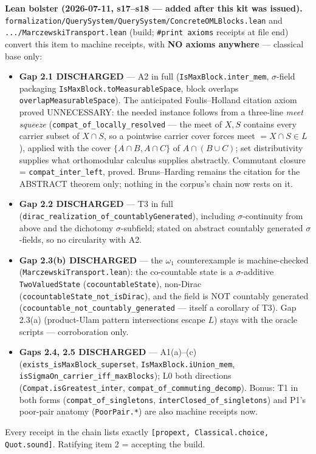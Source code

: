 \documentclass[11pt]{article}
\newcommand{\file}[1]{\texttt{\small #1}}
\begin{document}
\smallskip\noindent\textbf{Lean bolster (2026-07-11, s17--s18 --- added
after this kit was issued).}
\file{formalization/QuerySystem/QuerySystem/ConcreteOMLBlocks.lean} and
\file{.../MarczewskiTransport.lean} (build; \texttt{\#print axioms}
receipts at file end) convert this item to machine receipts, with
\textbf{NO axioms anywhere} --- classical base only:
\begin{itemize}[leftmargin=2em]
\item \textbf{Gap 2.1 DISCHARGED} --- A2 in full
  (\texttt{IsMaxBlock.inter\_mem}, $\sigma$-field packaging
  \texttt{IsMaxBlock.toMeasurableSpace}, block overlaps
  \texttt{overlapMeasurableSpace}). The anticipated Foulis--Holland
  citation axiom proved UNNECESSARY: the needed instance follows from a
  three-line \emph{meet squeeze} (\texttt{compat\_of\_locally\_resolved}
  --- the meet of $X, S$ contains every carrier subset of $X \cap S$, so
  a pointwise carrier cover forces meet $= X \cap S \in L$), applied
  with the cover $\{A \cap B, A \cap C\}$ of $A \cap (B \cup C)$; set
  distributivity supplies what orthomodular calculus supplies
  abstractly. Commutant closure = \texttt{compat\_inter\_left}, proved.
  Bruns--Harding remains the citation for the ABSTRACT theorem only;
  nothing in the corpus's chain now rests on it.
\item \textbf{Gap 2.2 DISCHARGED} --- T3 in full
  (\texttt{dirac\_realization\_of\_countablyGenerated}), including
  $\sigma$-continuity from above and the dichotomy $\sigma$-subfield;
  stated on abstract countably generated $\sigma$-fields, so no
  circularity with A2.
\item \textbf{Gap 2.3(b) DISCHARGED} --- the $\omega_1$ counterexample
  is machine-checked (\texttt{MarczewskiTransport.lean}): the
  co-countable state is a $\sigma$-additive \texttt{TwoValuedState}
  (\texttt{cocountableState}), non-Dirac
  (\texttt{cocountableState\_not\_isDirac}), and the field is NOT
  countably generated (\texttt{cocountable\_not\_countably\_generated}
  --- itself a corollary of T3). Gap 2.3(a) (product-Ulam pattern
  intersections escape $L$) stays with the oracle scripts ---
  corroboration only.
\item \textbf{Gaps 2.4, 2.5 DISCHARGED} --- A1(a)--(c)
  (\texttt{exists\_isMaxBlock\_superset}, \texttt{IsMaxBlock.iUnion\_mem},
  \texttt{isSigmaOn\_carrier\_iff\_maxBlocks}); L0 both directions
  (\texttt{Compat.isGreatest\_inter},
  \texttt{compat\_of\_commuting\_decomp}). Bonus: T1 in both forms
  (\texttt{compat\_of\_singletons}, \texttt{interClosed\_of\_singletons})
  and P1's poor-pair anatomy (\texttt{PoorPair.*}) are also machine
  receipts now.
\end{itemize}
Every receipt in the chain lists exactly \texttt{[propext,
Classical.choice, Quot.sound]}. Ratifying item 2 = accepting the build.
\end{document}

